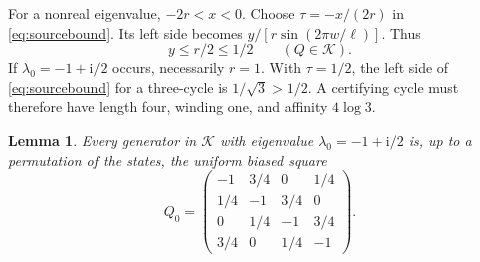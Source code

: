 \documentclass[11pt,a4paper]{article}
\newtheorem{lemma}{Lemma}
\newcommand{\K}{\mathcal K}
\newcommand{\ii}{\mathrm i}
\begin{document}
For a nonreal eigenvalue, $-2r<x<0$. Choose $\tau=-x/(2r)$ in
\eqref{eq:sourcebound}. Its left side becomes
$y/[r\sin(2\pi w/\ell)]$. Thus
\begin{equation}\label{eq:frequencybound}
 y\leq r/2\leq1/2 \qquad (Q\in\K).
\end{equation}
If $\lambda_0=-1+\ii/2$ occurs, necessarily $r=1$. With $\tau=1/2$,
the left side of \eqref{eq:sourcebound} for a three-cycle is
$1/\sqrt3>1/2$. A certifying cycle must therefore have length four,
winding one, and affinity $4\log3$.

\begin{lemma}\label{lem:rigidity}
Every generator in $\K$ with eigenvalue $\lambda_0=-1+\ii/2$ is, up
to a permutation of the states, the uniform biased square
\begin{equation}\label{eq:ring}
 Q_0=\begin{pmatrix}
 -1&3/4&0&1/4\\
 1/4&-1&3/4&0\\
 0&1/4&-1&3/4\\
 3/4&0&1/4&-1
 \end{pmatrix}.
\end{equation}
\end{lemma}
\end{document}
